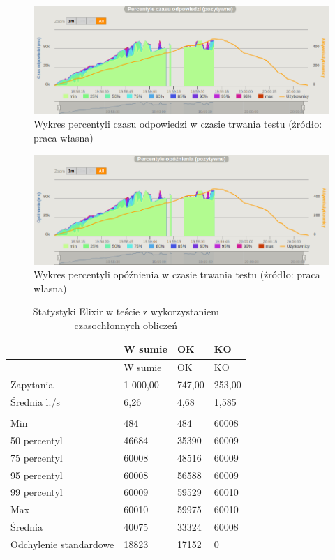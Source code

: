 \documentclass[12pt,twoside]{article}
\begin{document}
\begin{figure}[htbp]
\centering
\includegraphics[resolution=150]{test_results/elixir/fibonacci/screenshots/response_percentile.png}
\caption{Wykres percentyli czasu odpowiedzi w czasie trwania testu (źródło: praca własna)}
\end{figure}

\begin{figure}[htbp]
\centering
\includegraphics[resolution=150]{test_results/elixir/fibonacci/screenshots/latency_percentile.png}
\caption{Wykres percentyli opóźnienia w czasie trwania testu (źródło: praca własna)}
\end{figure}

\begin{longtable}[c]{@{}llll@{}}
\caption{Statystyki Elixir w teście z wykorzystaniem czasochłonnych
obliczeń}\tabularnewline
\toprule
& W sumie & OK & KO\tabularnewline
\midrule
\endfirsthead
\toprule
& W sumie & OK & KO\tabularnewline
\midrule
\endhead
Zapytania & 1 000,00 & 747,00 & 253,00\tabularnewline
Średnia l./s & 6,26 & 4,68 & 1,585\tabularnewline
& & &\tabularnewline
Min & 484 & 484 & 60008\tabularnewline
50 percentyl & 46684 & 35390 & 60009\tabularnewline
75 percentyl & 60008 & 48516 & 60009\tabularnewline
95 percentyl & 60008 & 56588 & 60009\tabularnewline
99 percentyl & 60009 & 59529 & 60010\tabularnewline
Max & 60010 & 59975 & 60010\tabularnewline
Średnia & 40075 & 33324 & 60008\tabularnewline
Odchylenie standardowe & 18823 & 17152 & 0\tabularnewline
\bottomrule
\end{longtable}
\end{document}
